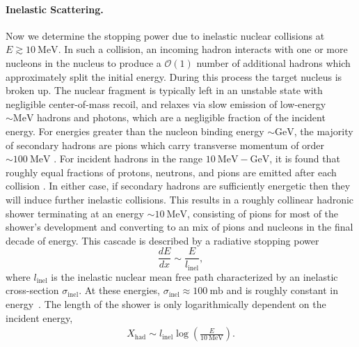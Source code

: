 \documentclass[twocolumn, preprintnumbers,amsmath,amssymb,prd, superscriptaddress]{revtex4}
\newcommand{\OO}{\mathcal{O}}
\newcommand{\GeV}{\text{GeV}}
\newcommand{\MeV}{\text{MeV}}
\def\r{\right)}
\def\l{\left(}
\begin{document}
\begin{appendices}
\paragraph{Inelastic Scattering.}
Now we determine the stopping power due to inelastic nuclear collisions at $E \gtrsim 10 ~\MeV$.
In such a collision, an incoming hadron interacts with one or more nucleons in the nucleus to produce a $\OO(1)$ number of additional hadrons which approximately split the initial energy.
During this process the target nucleus is broken up.
The nuclear fragment is typically left in an unstable state with negligible center-of-mass recoil, and relaxes via slow emission of low-energy $\sim \MeV$ hadrons and photons, which are a negligible fraction of the incident energy.
For energies greater than the nucleon binding energy $\sim \GeV$, the majority of secondary hadrons are pions which carry transverse momentum of order $\sim 100 ~\MeV$ \cite{Tavernier}.
For incident hadrons in the range $10 ~\MeV - \GeV$, it is found that roughly equal fractions of protons, neutrons, and pions are emitted after each collision \cite{Pionnuclear}.
In either case, if secondary hadrons are sufficiently energetic then they will induce further inelastic collisions.
This results in a roughly collinear hadronic shower terminating at an energy $\sim 10~\MeV$, consisting of pions for most of the shower's development and converting to an mix of pions and nucleons in the final decade of energy.
This cascade is described by a radiative stopping power
\begin{equation}
\label{eq:nucshower}
  \frac{dE}{dx} \sim \frac{E}{l_\text{inel}},
\end{equation}
where $l_\text{inel}$ is the inelastic nuclear mean free path characterized by an inelastic cross-section $\sigma_\text{inel}$.
At these energies, $\sigma_\text{inel} \approx 100 ~\text{mb}$ and is roughly constant in energy~\cite{Tavernier}.
The length of the shower is only logarithmically dependent on the incident energy,
\begin{align}
    X_\text{had} \sim l_\text{inel} \log\l\frac{E}{10~\MeV}\r.
\end{align}


\end{appendices}
\end{document}
